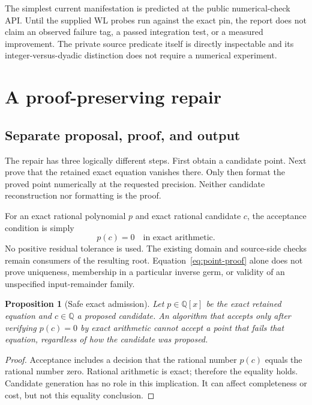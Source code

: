 \documentclass[11pt,letterpaper]{article}
\newtheorem{proposition}{Proposition}[section]
\begin{document}
The simplest current manifestation is predicted at the public numerical-check API. Until the supplied WL probes run against the exact pin, the report does not claim an observed failure tag, a passed integration test, or a measured improvement. The private source predicate itself is directly inspectable and its integer-versus-dyadic distinction does not require a numerical experiment.

\section{A proof-preserving repair}
\subsection{Separate proposal, proof, and output}

The repair has three logically different steps. First obtain a candidate point. Next prove that the retained exact equation vanishes there. Only then format the proved point numerically at the requested precision. Neither candidate reconstruction nor formatting is the proof.

For an exact rational polynomial $p$ and exact rational candidate $c$, the acceptance condition is simply
\begin{equation}\label{eq:point-proof}
 p(c)=0\quad\text{in exact arithmetic}.
\end{equation}
No positive residual tolerance is used. The existing domain and source-side checks remain consumers of the resulting root. Equation~\eqref{eq:point-proof} alone does not prove uniqueness, membership in a particular inverse germ, or validity of an unspecified input-remainder family.

\begin{proposition}[Safe exact admission]
Let $p\in\mathbb Q[x]$ be the exact retained equation and $c\in\mathbb Q$ a proposed candidate. An algorithm that accepts only after verifying $p(c)=0$ by exact arithmetic cannot accept a point that fails that equation, regardless of how the candidate was proposed.
\end{proposition}
\begin{proof}
Acceptance includes a decision that the rational number $p(c)$ equals the rational number zero. Rational arithmetic is exact; therefore the equality holds. Candidate generation has no role in this implication. It can affect completeness or cost, but not this equality conclusion.
\end{proof}
\end{document}
